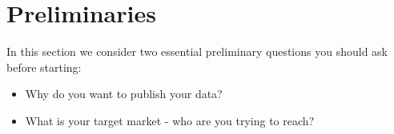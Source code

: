 \section{Preliminaries}

In this section we consider two essential preliminary questions you should ask before starting:

\begin{itemize}
    \item Why do you want to publish your data?
    \item What is your target market - who are you trying to reach?
\end{itemize}


